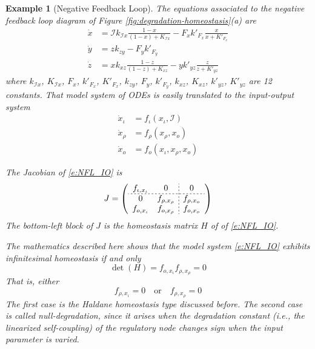 \documentclass[a4paper,fleqn]{cas-dc}
\newcommand{\II}{{\mathcal I}}
\newtheorem{example}{Example}[section]
\begin{document}
\begin{example}[Negative Feedback Loop]
The equations associated to the negative feedback loop diagram of Figure \ref{fig:degradation-homeostasis}(a) are
\begin{equation} \label{e:NFL}
\begin{split}
\dot{x} & = \II k_{\II x} \frac{1-x}{(1-x) + K_{\II x}} - F_xk'_{F_x}\frac{x}{x + K'_{F_x}}\\
\dot{y} & = z k_{zy} - F_yk'_{F_y}\\
\dot{z} & = x k_{xz}\frac{1-z}{(1-z)+K_{xz}} - yk'_{yz}\frac{z}{z+K'_{yz}}
\end{split}
\end{equation}
where $k_{\II x}$, $K_{\II x}$, $F_x$, $k'_{F_x}$, $K'_{F_x}$, $k_{zy}$, $F_y$, $k'_{F_y}$, $k_{xz}$, $K_{xz}$, $k'_{yz}$, $K'_{yz}$ are 12 constants.
That model system of ODEs is easily translated to the input-output system
\begin{equation} \label{e:NFL_IO}
\begin{split}
\dot{x}_\iota & = f_\iota(x_\iota, \II) \\
\dot{x}_\rho & = f_\rho( x_\rho, x_o)  \\
\dot{x}_o & = f_o(x_\iota,x_\rho, x_o) 
\end{split}
\end{equation}

The Jacobian of \eqref{e:NFL_IO} is 
\begin{equation} \label{e:J_NFL_IO}
J = \left( \begin{array}{cc;{2pt/2pt}c}
f_{\iota, x_\iota} & 0 & 0 \\ \hdashline[2pt/2pt]
0 & f_{\rho,x_\rho} & f_{\rho, x_o} \\
f_{o, x_\iota} & f_{o, x_\rho} & f_{o, x_o}
\end{array} \right)
\end{equation}
The bottom-left block of $J$ is the homeostasis matrix $H$ of of \eqref{e:NFL_IO}.

The mathematics described here shows that the model system \eqref{e:NFL_IO} exhibits infinitesimal homeostasis if and only 
\begin{equation}
\det(H) = f_{o,x_\iota} f_{\rho,x_\rho} = 0
\end{equation}
That is, either 
\begin{equation} \label{e:homeo_null_deg}
f_{\rho,x_\iota} = 0 
\quad\text{or}\quad 
f_{\rho,x_\rho} = 0
\end{equation}
The first case is the Haldane homeostasis type discussed before.
The second case is called \emph{null-degradation}, since it arises when the degradation constant (i.e., the linearized self-coupling) of the
regulatory node changes sign when the input parameter is varied.


\end{example}
\end{document}
